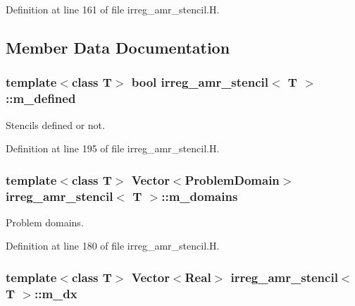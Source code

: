 Definition at line 161 of file irreg\+\_\+amr\+\_\+stencil.\+H.



\subsection{Member Data Documentation}
\subsubsection[{\texorpdfstring{m\+\_\+defined}{m_defined}}]{\setlength{\rightskip}{0pt plus 5cm}template$<$class T$>$ bool {\bf irreg\+\_\+amr\+\_\+stencil}$<$ T $>$\+::m\+\_\+defined\hspace{0.3cm}{\ttfamily [protected]}}\hypertarget{classirreg__amr__stencil_ac9c1b87a0a04184fe0ebb9747525d88b}{}\label{classirreg__amr__stencil_ac9c1b87a0a04184fe0ebb9747525d88b}


Stencils defined or not. 



Definition at line 195 of file irreg\+\_\+amr\+\_\+stencil.\+H.

\subsubsection[{\texorpdfstring{m\+\_\+domains}{m_domains}}]{\setlength{\rightskip}{0pt plus 5cm}template$<$class T$>$ Vector$<$Problem\+Domain$>$ {\bf irreg\+\_\+amr\+\_\+stencil}$<$ T $>$\+::m\+\_\+domains\hspace{0.3cm}{\ttfamily [protected]}}\hypertarget{classirreg__amr__stencil_ac71ace8f7e0435f40567e3aaa23bc98f}{}\label{classirreg__amr__stencil_ac71ace8f7e0435f40567e3aaa23bc98f}


Problem domains. 



Definition at line 180 of file irreg\+\_\+amr\+\_\+stencil.\+H.

\subsubsection[{\texorpdfstring{m\+\_\+dx}{m_dx}}]{\setlength{\rightskip}{0pt plus 5cm}template$<$class T$>$ Vector$<$Real$>$ {\bf irreg\+\_\+amr\+\_\+stencil}$<$ T $>$\+::m\+\_\+dx\hspace{0.3cm}{\ttfamily [protected]}}\hypertarget{classirreg__amr__stencil_a9ecea0f6fdf4c2cf054784ceb7c77a8f}{}\label{classirreg__amr__stencil_a9ecea0f6fdf4c2cf054784ceb7c77a8f}


